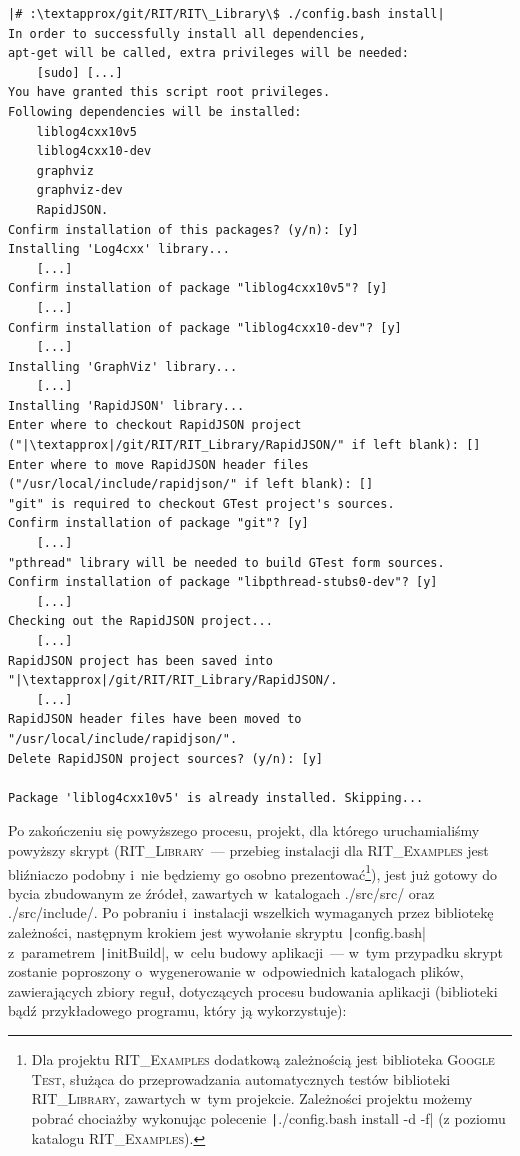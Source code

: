 \begin{verbatim}
|# :\textapprox/git/RIT/RIT\_Library\$ ./config.bash install|
In order to successfully install all dependencies,
apt-get will be called, extra privileges will be needed:
	[sudo] [...]
You have granted this script root privileges.
Following dependencies will be installed:
	liblog4cxx10v5
	liblog4cxx10-dev
	graphviz
	graphviz-dev
	RapidJSON.
Confirm installation of this packages? (y/n): [y]
Installing 'Log4cxx' library...
	[...]
Confirm installation of package "liblog4cxx10v5"? [y]
	[...]
Confirm installation of package "liblog4cxx10-dev"? [y]
	[...]
Installing 'GraphViz' library...
	[...]
Installing 'RapidJSON' library...
Enter where to checkout RapidJSON project ("|\textapprox|/git/RIT/RIT_Library/RapidJSON/" if left blank): []
Enter where to move RapidJSON header files ("/usr/local/include/rapidjson/" if left blank): []
"git" is required to checkout GTest project's sources.
Confirm installation of package "git"? [y]
	[...]
"pthread" library will be needed to build GTest form sources.
Confirm installation of package "libpthread-stubs0-dev"? [y]
	[...]
Checking out the RapidJSON project...
	[...]
RapidJSON project has been saved into "|\textapprox|/git/RIT/RIT_Library/RapidJSON/.
	[...]
RapidJSON header files have been moved to "/usr/local/include/rapidjson/".
Delete RapidJSON project sources? (y/n): [y]

Package 'liblog4cxx10v5' is already installed. Skipping...
\end{verbatim}

Po zakończeniu się powyższego procesu, projekt, dla którego uruchamialiśmy powyższy skrypt (\textsc{RIT\_Library}~--- przebieg instalacji dla \textsc{RIT\_Examples} jest bliźniaczo podobny i~nie będziemy go osobno prezentować\footnote{
	Dla projektu \textsc{RIT\_Examples} dodatkową zależnością jest biblioteka \textsc{Google Test}, służąca do przeprowadzania automatycznych testów biblioteki \textsc{RIT\_Library}, zawartych w~tym projekcie.
	Zależności projektu możemy pobrać chociażby wykonując polecenie \texttt|./config.bash install -d -f| (z poziomu katalogu \textsc{RIT\_Examples}).
}), jest już gotowy do bycia zbudowanym ze źródeł, zawartych w~katalogach \textsf{./src/src/} oraz \textsf{./src/include/}.
Po pobraniu i~instalacji wszelkich wymaganych przez bibliotekę zależności, następnym krokiem jest wywołanie skryptu \texttt|config.bash| z~parametrem \texttt|initBuild|, w~celu budowy aplikacji~--- w~tym przypadku skrypt zostanie poproszony o~wygenerowanie w~odpowiednich katalogach plików, zawierających zbiory reguł, dotyczących procesu budowania aplikacji (biblioteki bądź przykładowego programu, który ją wykorzystuje):

